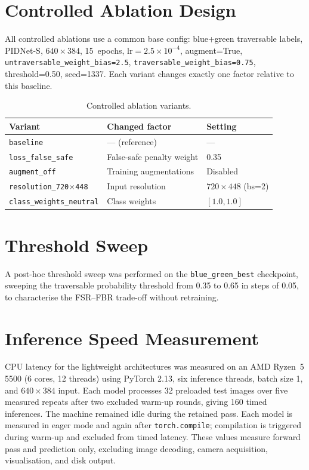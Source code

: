 \documentclass[12pt,a4paper]{report}
\begin{document}
\section{Controlled Ablation Design}

All controlled ablations use a common base config: blue+green traversable labels, PIDNet-S, $640\times384$, 15~epochs, $\text{lr}{=}2.5 \times 10^{-4}$, augment=True, \texttt{untraversable\_weight\_bias=2.5}, \texttt{traversable\_weight\_bias=0.75}, threshold=0.50, seed=1337.
Each variant changes exactly one factor relative to this baseline.

\begin{table}[H]
\centering
\caption{Controlled ablation variants.}
\label{tab:ablation_design}
\small
\begin{tabular}{@{}lll@{}}
\toprule
\textbf{Variant} & \textbf{Changed factor} & \textbf{Setting} \\
\midrule
\texttt{baseline}                 & --- (reference)              & --- \\
\texttt{loss\_false\_safe}        & False-safe penalty weight     & 0.35 \\
\texttt{augment\_off}             & Training augmentations        & Disabled \\
\texttt{resolution\_720$\times$448} & Input resolution             & $720\times448$ (bs=2) \\
\texttt{class\_weights\_neutral}  & Class weights                & $[1.0, 1.0]$ \\
\bottomrule
\end{tabular}
\end{table}

\section{Threshold Sweep}

A post-hoc threshold sweep was performed on the \texttt{blue\_green\_best} checkpoint, sweeping the traversable probability threshold from 0.35 to 0.65 in steps of 0.05, to characterise the FSR--FBR trade-off without retraining.

\section{Inference Speed Measurement}

CPU latency for the lightweight architectures was measured on an AMD Ryzen~5
5500 (6 cores, 12 threads) using PyTorch 2.13, six inference threads, batch size
1, and $640\times384$ input. Each model processes 32 preloaded test images over
five measured repeats after two excluded warm-up rounds, giving 160 timed
inferences. The machine remained idle during the retained pass. Each model is
measured in eager mode and again after \texttt{torch.compile}; compilation is
triggered during warm-up and excluded from timed latency. These values measure
forward pass and prediction only, excluding image decoding, camera acquisition,
visualisation, and disk output.
\end{document}
